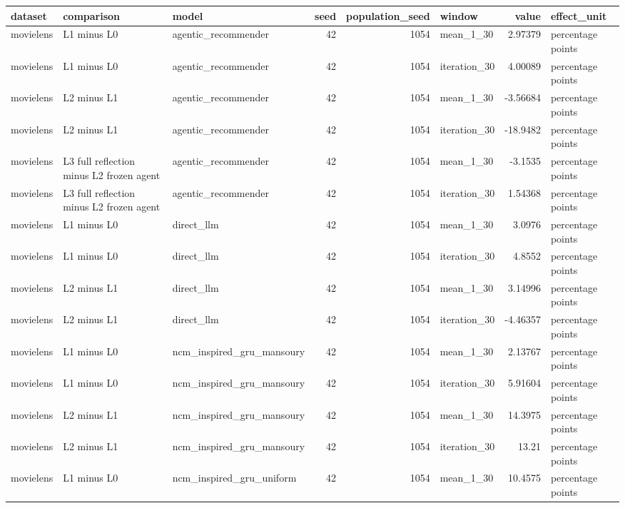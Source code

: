 \begin{table}[htbp!]
\centering
\small
\setlength{\tabcolsep}{3pt}
\renewcommand{\arraystretch}{1.1}
\begin{tabular}{lllrrlrl}
\hline
dataset & comparison & model & seed & population\_seed & window & value & effect\_unit \\
\hline
movielens & L1 minus L0 & agentic\_recommender & 42 & 1054 & mean\_1\_30 & 2.97379 & percentage points \\
movielens & L1 minus L0 & agentic\_recommender & 42 & 1054 & iteration\_30 & 4.00089 & percentage points \\
movielens & L2 minus L1 & agentic\_recommender & 42 & 1054 & mean\_1\_30 & -3.56684 & percentage points \\
movielens & L2 minus L1 & agentic\_recommender & 42 & 1054 & iteration\_30 & -18.9482 & percentage points \\
movielens & L3 full reflection minus L2 frozen agent & agentic\_recommender & 42 & 1054 & mean\_1\_30 & -3.1535 & percentage points \\
movielens & L3 full reflection minus L2 frozen agent & agentic\_recommender & 42 & 1054 & iteration\_30 & 1.54368 & percentage points \\
movielens & L1 minus L0 & direct\_llm & 42 & 1054 & mean\_1\_30 & 3.0976 & percentage points \\
movielens & L1 minus L0 & direct\_llm & 42 & 1054 & iteration\_30 & 4.8552 & percentage points \\
movielens & L2 minus L1 & direct\_llm & 42 & 1054 & mean\_1\_30 & 3.14996 & percentage points \\
movielens & L2 minus L1 & direct\_llm & 42 & 1054 & iteration\_30 & -4.46357 & percentage points \\
movielens & L1 minus L0 & ncm\_inspired\_gru\_mansoury & 42 & 1054 & mean\_1\_30 & 2.13767 & percentage points \\
movielens & L1 minus L0 & ncm\_inspired\_gru\_mansoury & 42 & 1054 & iteration\_30 & 5.91604 & percentage points \\
movielens & L2 minus L1 & ncm\_inspired\_gru\_mansoury & 42 & 1054 & mean\_1\_30 & 14.3975 & percentage points \\
movielens & L2 minus L1 & ncm\_inspired\_gru\_mansoury & 42 & 1054 & iteration\_30 & 13.21 & percentage points \\
movielens & L1 minus L0 & ncm\_inspired\_gru\_uniform & 42 & 1054 & mean\_1\_30 & 10.4575 & percentage points \\

\end{tabular}
\end{table}
